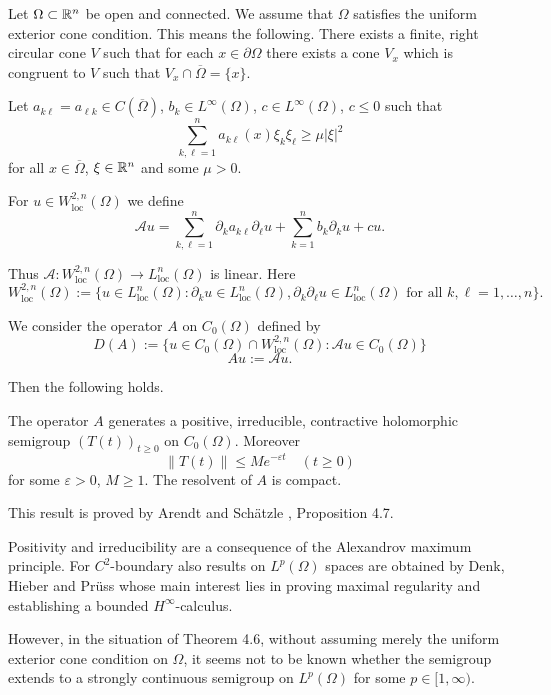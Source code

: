 Let $\Omega \subset \mathbb{R}^n$ be open and connected. We assume that $\Omega$ satisfies the uniform exterior cone condition. This means the following. There exists a finite, right circular cone $V$ such that for each $x \in \partial\Omega$ there exists a cone $V_x$ which is congruent to $V$ such that $V_x \cap \overline{\Omega} = \{x\}$.

Let $a_{k\ell} = a_{\ell k} \in C(\overline{\Omega})$, $b_k \in L^\infty(\Omega)$, $c \in L^\infty(\Omega)$, $c \leq 0$ such that
\[\sum_{k,\ell=1}^n a_{k\ell}(x)\xi_k\xi_\ell \geq \mu|\xi|^2\]
for all $x \in \overline{\Omega}$, $\xi \in \mathbb{R}^n$ and some $\mu > 0$.

For $u \in W^{2,n}_{\text{loc}}(\Omega)$ we define
\[\mathcal{A}u = \sum_{k,\ell=1}^n \partial_k a_{k\ell} \partial_\ell u + \sum_{k=1}^n b_k \partial_k u + cu.\]

Thus $\mathcal{A} \colon W^{2,n}_{\text{loc}}(\Omega) \to L^n_{\text{loc}}(\Omega)$ is linear. Here
\[W^{2,n}_{\text{loc}}(\Omega) := \{u \in L^n_{\text{loc}}(\Omega) \colon \partial_k u \in L^n_{\text{loc}}(\Omega), \partial_k \partial_\ell u \in L^n_{\text{loc}}(\Omega) \text{ for all } k, \ell = 1, \ldots, n\}.\]

We consider the operator $A$ on $C_0(\Omega)$ defined by
\[D(A) := \{u \in C_0(\Omega) \cap W^{2,n}_{\text{loc}}(\Omega) \colon \mathcal{A}u \in C_0(\Omega)\}\]
\[Au := \mathcal{A}u.\]

Then the following holds.

\begin{theorem}
The operator $A$ generates a positive, irreducible, contractive holomorphic semigroup $(T(t))_{t \geq 0}$ on $C_0(\Omega)$. Moreover
\[\|T(t)\| \leq Me^{-\varepsilon t} \quad (t \geq 0)\]
for some $\varepsilon > 0$, $M \geq 1$. The resolvent of $A$ is compact.
\end{theorem}
This result is proved by Arendt and Schätzle \cite{AS14}, Proposition 4.7. 

Positivity and irreducibility are a consequence of the Alexandrov maximum principle. For $C^2$-boundary also results on $L^p(\Omega)$ spaces are obtained by Denk, Hieber and Prüss \cite{DHP03} whose main interest lies in proving maximal regularity and establishing a bounded $H^\infty$-calculus.

However, in the situation of Theorem 4.6, without assuming merely the uniform exterior cone condition on $\Omega$, it seems not to be known whether the semigroup extends to a strongly continuous semigroup on $L^p(\Omega)$ for some $p \in [1,\infty)$.

